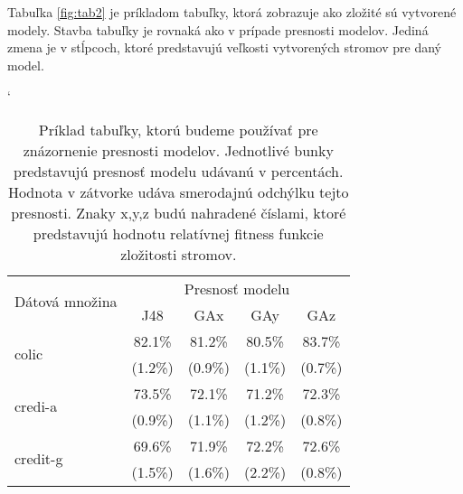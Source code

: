 Tabuľka \ref{fig:tab2} je príkladom tabuľky, ktorá zobrazuje ako zložité sú vytvorené modely. Stavba tabuľky je rovnaká ako v prípade presnosti modelov. Jediná zmena je v stĺpcoch, ktoré predstavujú veľkosti vytvorených stromov pre daný model.

\renewcommand{\figurename}{Tabuľka}
\begin{table}[h]
\catcode`
\centering 
\newcommand\T{\rule{0pt}{2.6ex}}       %
\newcommand\B{\rule[-1.2ex]{0pt}{0pt}} %
\begin{tabular}{|l||c|c|c|c||}
\hline \multirow{2}{*}{Dátová množina} & \multicolumn{4}{|c||}{Presnosť modelu} \\ 
\cline{2-5} & J48 & GAx & GAy & GAz \\
\hline
\hline \multirow{2}{*}{colic} & 82.1\% & 81.2\% & 80.5\% & 83.7\% \T\\[-1.5ex]
& \tiny (1.2\%) & \tiny (0.9\%) & \tiny (1.1\%) & \tiny (0.7\%)\B\\
\hline \multirow{2}{*}{credi-a} & 73.5\% & 72.1\% & 71.2\% & 72.3\% \T\\[-1.5ex]
& \tiny (0.9\%) & \tiny (1.1\%) & \tiny (1.2\%) & \tiny (0.8\%)\B\\
\hline \multirow{2}{*}{credit-g} & 69.6\% & 71.9\% & 72.2\% & 72.6\% \T\\[-1.5ex]
& \tiny (1.5\%) & \tiny (1.6\%) & \tiny (2.2\%) & \tiny (0.8\%)\B\\
\hline
\end{tabular}
\caption{Príklad tabuľky, ktorú budeme používať pre znázornenie presnosti modelov. Jednotlivé bunky predstavujú presnosť modelu udávanú v percentách. Hodnota v zátvorke udáva smerodajnú odchýlku tejto presnosti. Znaky x,y,z budú nahradené číslami, ktoré predstavujú hodnotu relatívnej fitness funkcie zložitosti stromov.}\label{fig:tab1}
\end{table}


